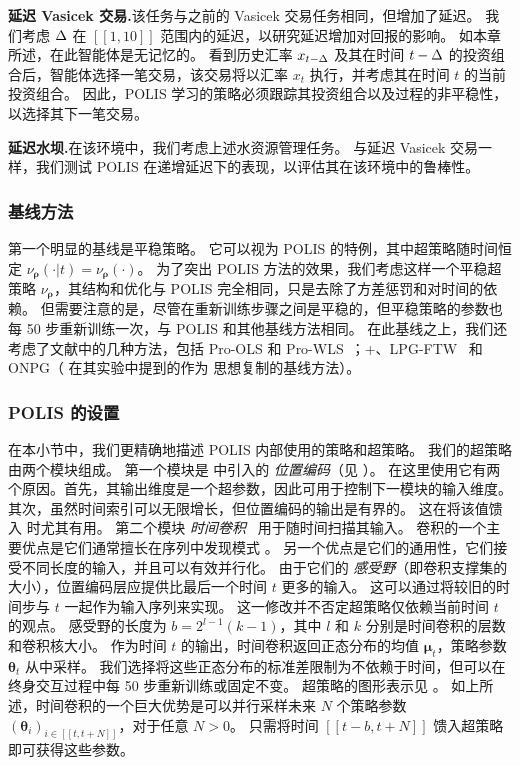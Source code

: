 \noindent\textbf{延迟 Vasicek 交易.}\indent 该任务与之前的 Vasicek 交易任务相同，但增加了延迟。
我们考虑 $\Delta$ 在 $[\![1,10]\!]$ 范围内的延迟，以研究延迟增加对回报的影响。
如本章所述，在此智能体是无记忆的。
看到历史汇率 $x_{t-\Delta}$ 及其在时间 $t-\Delta$ 的投资组合后，智能体选择一笔交易，该交易将以汇率 $x_t$ 执行，并考虑其在时间 $t$ 的当前投资组合。
因此，POLIS 学习的策略必须跟踪其投资组合以及过程的非平稳性，以选择其下一笔交易。

\noindent\textbf{延迟水坝.}\indent 在该环境中，我们考虑上述水资源管理任务。
与延迟 Vasicek 交易一样，我们测试 POLIS 在递增延迟下的表现，以评估其在该环境中的鲁棒性。

\subsubsection{基线方法}
第一个明显的基线是平稳策略。
它可以视为 POLIS 的特例，其中超策略随时间恒定 $\nu_{\boldsymbol\rho}(\cdot\vert t)=\nu_{\boldsymbol\rho}(\cdot)$。
为了突出 POLIS 方法的效果，我们考虑这样一个平稳超策略 $\nu_{\boldsymbol\rho}$，其结构和优化与 POLIS 完全相同，只是去除了方差惩罚和对时间的依赖。
但需要注意的是，尽管在重新训练步骤之间是平稳的，但平稳策略的参数也每 50 步重新训练一次，与 POLIS 和其他基线方法相同。
在此基线之上，我们还考虑了文献中的几种方法，包括 Pro-OLS 和 Pro-WLS~\cite{chandak2020optimizing}；+、LPG-FTW~\cite{mendez2020lifelong} 和 ONPG（\cite{chandak2020optimizing} 在其实验中提到的作为 \cite{al-shedivat2018continuous} 思想复制的基线方法）。


\subsubsection{POLIS 的设置}
在本小节中，我们更精确地描述 POLIS 内部使用的策略和超策略。
我们的超策略由两个模块组成。
第一个模块是 \cite{vaswani2017attention} 中引入的 \emph{位置编码}（见 ）。
在这里使用它有两个原因。首先，其输出维度是一个超参数，因此可用于控制下一模块的输入维度。
其次，虽然时间索引可以无限增长，但位置编码的输出是有界的。
这在将该值馈入  时尤其有用。
第二个模块 \emph{时间卷积}~\cite{oord2016wavenet} 用于随时间扫描其输入。
卷积的一个主要优点是它们通常擅长在序列中发现模式 \cite{liotet2020deep}。
另一个优点是它们的通用性，它们接受不同长度的输入，并且可以有效并行化。
由于它们的 \emph{感受野}（即卷积支撑集的大小），位置编码层应提供比最后一个时间 $t$ 更多的输入。
这可以通过将较旧的时间步与 $t$ 一起作为输入序列来实现。
这一修改并不否定超策略仅依赖当前时间 $t$ 的观点。
感受野的长度为 $b=2^{l-1}(k-1)$，其中 $l$ 和 $k$ 分别是时间卷积的层数和卷积核大小。
作为时间 $t$ 的输出，时间卷积返回正态分布的均值 $\boldsymbol{\mu}_t$，策略参数 $\boldsymbol\theta_t$ 从中采样。
我们选择将这些正态分布的标准差限制为不依赖于时间，但可以在终身交互过程中每 50 步重新训练或固定不变。
超策略的图形表示见 。
如上所述，时间卷积的一个巨大优势是可以并行采样未来 $N$ 个策略参数 $(\boldsymbol\theta_i)_{i\in[\![t,t+N]\!]}$，对于任意 $N>0$。
只需将时间 $[\![t-b,t+N]\!]$ 馈入超策略即可获得这些参数。

